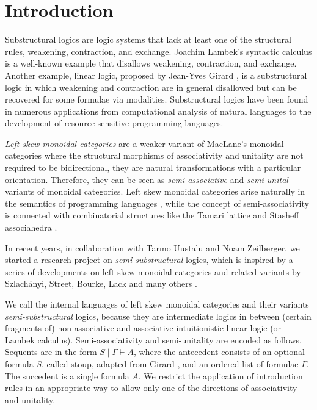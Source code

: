 \documentclass[submission,copyright,creativecommons]{eptcs}
\theoremstyle{definition}
\begin{document}
\section{Introduction}\label{sec:intro}
Substructural logics are logic systems that lack at least one of the structural rules, weakening, contraction, and exchange.
Joachim Lambek's syntactic calculus \cite{lambek:mathematics:58} is a well-known example that disallows weakening, contraction, and exchange.
Another example, linear logic, proposed by Jean-Yves Girard \cite{girard:linear:87}, is a substructural logic in which weakening and contraction are in general disallowed but can be recovered for some formulae via modalities.
Substructural logics have been found in numerous applications from computational analysis of natural languages to the development of resource-sensitive programming languages.

\emph{Left skew monoidal categories} \cite{szlachanyi:skew-monoidal:2012} are a weaker variant of MacLane's monoidal categories where the structural morphisms of associativity and unitality are not required to be bidirectional, they are natural transformations with a particular orientation.
Therefore, they can be seen as \emph{semi-associative} and \emph{semi-unital} variants of monoidal categories. 
Left skew monoidal categories arise naturally in the semantics of programming languages \cite{altenkirch:monads:2014}, while the concept of semi-associativity is connected with combinatorial structures like the Tamari lattice and Stasheff associahedra \cite{zeilberger:semiassociative:19}.

In recent years, in collaboration with Tarmo Uustalu and Noam Zeilberger, we started a research project on \emph{semi-substructural} logics, which is inspired by a series of developments on left skew monoidal categories and related variants by Szlach{\'a}nyi, Street, Bourke, Lack and many others \cite{szlachanyi:skew-monoidal:2012,street:skew-closed:2013,lack:triangulations:2014,bourke:skew:2018,bourke:lack:braided:2020}.

We call the internal languages of left skew monoidal categories and their variants \emph{semi-substructural} logics, because they are intermediate logics in between (certain fragments of) non-associative and associative intuitionistic linear logic (or Lambek calculus).
Semi-associativity and semi-unitality are encoded as follows.
Sequents are in the form $S \mid \Gamma \vdash A$, where the antecedent consists of an optional formula $S$, called stoup, adapted from Girard \cite{girard:constructive:91}, and an ordered list of formulae $\Gamma$.
The succedent is a single formula $A$.
We restrict the application of introduction rules in an appropriate way to allow only one of the directions of associativity and unitality.
\end{document}
